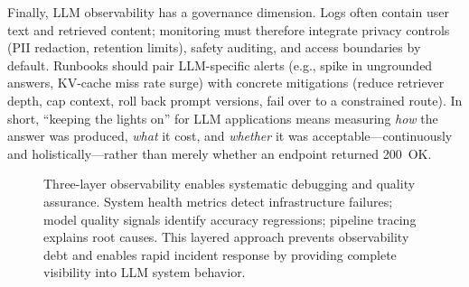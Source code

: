 Finally, LLM observability has a governance dimension. Logs often contain user text and retrieved content; monitoring must therefore integrate privacy controls (PII redaction, retention limits), safety auditing, and access boundaries by default. Runbooks should pair LLM-specific alerts (e.g., spike in ungrounded answers, KV-cache miss rate surge) with concrete mitigations (reduce retriever depth, cap context, roll back prompt versions, fail over to a constrained route). In short, ``keeping the lights on'' for LLM applications means measuring \emph{how} the answer was produced, \emph{what} it cost, and \emph{whether} it was acceptable---continuously and holistically---rather than merely whether an endpoint returned 200~OK.

\begin{figure}[t]
\centering
\begin{llmfigbox}
\end{llmfigbox}
\caption{Three-layer observability enables systematic debugging and quality assurance. System health metrics detect infrastructure failures; model quality signals identify accuracy regressions; pipeline tracing explains root causes. This layered approach prevents observability debt and enables rapid incident response by providing complete visibility into LLM system behavior.}
\label{fig:ch05_telemetry_layers}
\end{figure}

